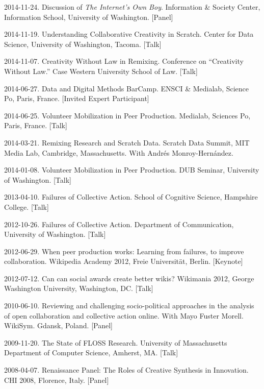\documentclass[10pt]{article}
\newenvironment{cvlist}{
\begin{list}{}{\leftmargin=3.0em \itemindent=-3.0em}
  \setlength{\itemsep}{0pt}
  \setlength{\parskip}{0em}
  \setlength{\parsep}{1em}
  \setlength{\parindent}{0em}}
{\vspace{1em}
\end{list}}
\begin{document}
\begin{cvlist}

\item 2014-11-24. Discussion of \emph{The Internet's Own Boy}. Information \& Society Center, Information School, University of Washington. [Panel]
\item 2014-11-19. Understanding Collaborative Creativity in Scratch. Center for Data Science, University of Washington, Tacoma. [Talk]
\item 2014-11-07. Creativity Without Law in Remixing. Conference on ``Creativity Without Law.'' Case Western University School of Law. [Talk]
\item 2014-06-27. Data and Digital Methods BarCamp. ENSCI \& Medialab, Science Po, Paris, France. [Invited Expert Participant]
\item 2014-06-25. Volunteer Mobilization in Peer Production. Medialab, Sciences Po, Paris, France. [Talk]
\item 2014-03-21. Remixing Research and Scratch Data. Scratch Data Summit, MIT Media Lab, Cambridge, Massachusetts. With Andrés Monroy-Hernández.
\item 2014-01-08. Volunteer Mobilization in Peer Production. DUB Seminar, University of Washington. [Talk]
\item 2013-04-10. Failures of Collective Action. School of Cognitive Science, Hampshire College. [Talk]
\item 2012-10-26. Failures of Collective Action. Department of Communication, University of Washington. [Talk]
\item 2012-06-29. When peer production works: Learning from failures, to improve collaboration. Wikipedia Academy 2012, Freie Universität, Berlin. [Keynote]
\item 2012-07-12. Can can social awards create better wikis? Wikimania 2012, George Washington University, Washington, DC. [Talk]
\item 2010-06-10. Reviewing and challenging socio-political approaches in the analysis of open collaboration and collective action online. With Mayo Fuster Morell. WikiSym. Gdansk, Poland. [Panel]
\item 2009-11-20. The State of FLOSS Research. University of Massachusetts Department of Computer Science, Amherst, MA. [Talk]
\item 2008-04-07. Renaissance Panel: The Roles of Creative Synthesis in Innovation. CHI 2008, Florence, Italy. [Panel]

\end{cvlist}
\end{document}
